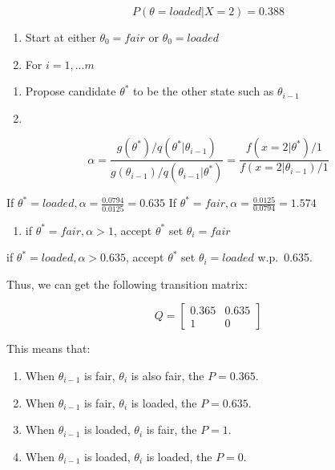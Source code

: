 \documentclass[]{book}
\providecommand{\tightlist}{%
  \setlength{\itemsep}{0pt}\setlength{\parskip}{0pt}}
\begin{document}
\[P(\theta=loaded | X=2)=0.388\]

\begin{enumerate}
\def\labelenumi{(\arabic{enumi})}
\item
  Start at either \(\theta_0=fair\) or \(\theta_0=loaded\)
\item
  For \(i=1, ...m\)
\end{enumerate}

\begin{enumerate}
\def\labelenumi{(\alph{enumi})}
\item
  Propose candidate \(\theta^*\) to be the other state such as
  \(\theta_{i-1}\)
\item
\end{enumerate}

\[\alpha=\frac{g(\theta^*)/q(\theta^*|\theta_{i-1})}{g(\theta_{i-1})/q(\theta_{i-1}|\theta^*)}=\frac{f(x=2|\theta^*)/1}{f(x=2|\theta_{i-1})/1}\]

If \(\theta^*=loaded, \alpha=\frac{0.0794}{0.0125}=0.635\) If
\(\theta^*=fair, \alpha=\frac{0.0125}{0.0794}=1.574\)

\begin{enumerate}
\def\labelenumi{(\alph{enumi})}
\setcounter{enumi}{2}
\tightlist
\item
  if \(\theta^*=fair, \alpha>1\), accept \(\theta^*\) set
  \(\theta_i=fair\)
\end{enumerate}

if \(\theta^*=loaded, \alpha>0.635\), accept \(\theta^*\) set
\(\theta_i=loaded\) w.p.~0.635.

Thus, we can get the following transition matrix:

\[Q=\begin{bmatrix} 0.365 & 0.635  \\ 1 & 0  \end{bmatrix}\]

This means that:

\begin{enumerate}
\def\labelenumi{(\arabic{enumi})}
\item
  When \(\theta_{i-1}\) is fair, \(\theta_{i}\) is also fair, the
  \(P=0.365\).
\item
  When \(\theta_{i-1}\) is fair, \(\theta_{i}\) is loaded, the
  \(P=0.635\).
\item
  When \(\theta_{i-1}\) is loaded, \(\theta_{i}\) is fair, the \(P=1\).
\item
  When \(\theta_{i-1}\) is loaded, \(\theta_{i}\) is loaded, the
  \(P=0\).
\end{enumerate}
\end{document}
